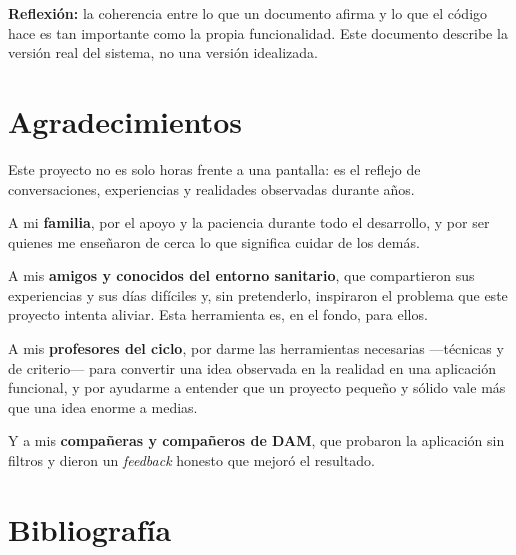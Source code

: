 \documentclass[12pt,a4paper]{report}
\begin{document}
\textbf{Reflexión:} la coherencia entre lo que un documento afirma y lo que el código hace es tan importante como la propia funcionalidad. Este documento describe la versión real del sistema, no una versión idealizada.

\chapter*{Agradecimientos}

Este proyecto no es solo horas frente a una pantalla: es el reflejo de conversaciones, experiencias y realidades observadas durante años.

A mi \textbf{familia}, por el apoyo y la paciencia durante todo el desarrollo, y por ser quienes me enseñaron de cerca lo que significa cuidar de los demás.

A mis \textbf{amigos y conocidos del entorno sanitario}, que compartieron sus experiencias y sus días difíciles y, sin pretenderlo, inspiraron el problema que este proyecto intenta aliviar. Esta herramienta es, en el fondo, para ellos.

A mis \textbf{profesores del ciclo}, por darme las herramientas necesarias —técnicas y de criterio— para convertir una idea observada en la realidad en una aplicación funcional, y por ayudarme a entender que un proyecto pequeño y sólido vale más que una idea enorme a medias.

Y a mis \textbf{compañeras y compañeros de DAM}, que probaron la aplicación sin filtros y dieron un \emph{feedback} honesto que mejoró el resultado.

\chapter*{Bibliografía}
\end{document}
